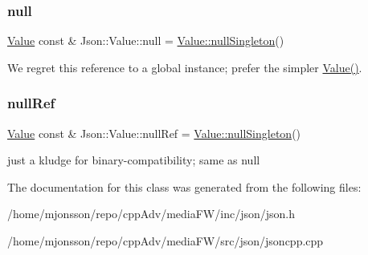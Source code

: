 \subsubsection{\texorpdfstring{null}{null}}
{\footnotesize\ttfamily \hyperlink{classJson_1_1Value}{Value} const  \& Json\+::\+Value\+::null = \hyperlink{classJson_1_1Value_af2f124567acc35d021a424e53ebdfcab}{Value\+::null\+Singleton}()\hspace{0.3cm}{\ttfamily [static]}}

We regret this reference to a global instance; prefer the simpler \hyperlink{classJson_1_1Value_ada6ba1369448fb0240bccc36efaa46f7}{Value()}. \mbox{\label{classJson_1_1Value_aaee27e622f87266f861216d644603730}} 
\subsubsection{\texorpdfstring{null\+Ref}{nullRef}}
{\footnotesize\ttfamily \hyperlink{classJson_1_1Value}{Value} const  \& Json\+::\+Value\+::null\+Ref = \hyperlink{classJson_1_1Value_af2f124567acc35d021a424e53ebdfcab}{Value\+::null\+Singleton}()\hspace{0.3cm}{\ttfamily [static]}}

just a kludge for binary-\/compatibility; same as null 

The documentation for this class was generated from the following files\+:\begin{DoxyCompactItemize}
\item 
/home/mjonsson/repo/cpp\+Adv/media\+F\+W/inc/json/json.\+h\item 
/home/mjonsson/repo/cpp\+Adv/media\+F\+W/src/json/jsoncpp.\+cpp\end{DoxyCompactItemize}
